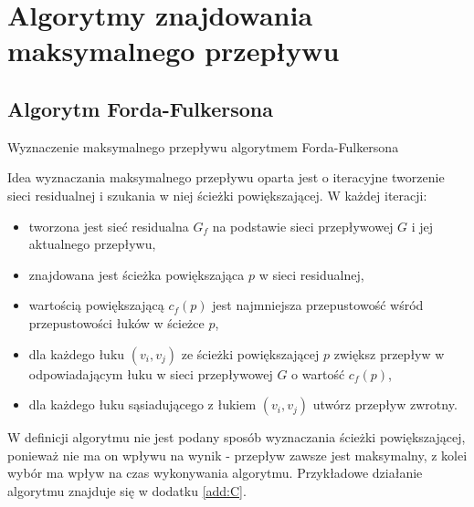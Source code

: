 \section{Algorytmy znajdowania maksymalnego przepływu}
\subsection{Algorytm Forda-Fulkersona}\label{ssec:FordFulkersonAnaliza}
\begin{algorithm}[H]
	\caption{Wyznaczenie maksymalnego przepływu algorytmem Forda-Fulkersona}\label{fordFulkersonPseudo}
	\begin{algorithmic}
				\EndFor
			\EndWhile\space
		\EndProcedure
	\end{algorithmic}
\end{algorithm}\noindent
Idea wyznaczania maksymalnego przepływu oparta jest o iteracyjne tworzenie sieci residualnej i szukania w niej ścieżki powiększającej. W każdej iteracji:
\begin{itemize}
	\item tworzona jest sieć residualna $ G_f $ na podstawie sieci przepływowej $ G $ i jej aktualnego przepływu,
	\item znajdowana jest ścieżka powiększająca $ p $ w sieci residualnej,
	\item wartością powiększającą $ c_f(p) $ jest najmniejsza przepustowość wśród przepustowości łuków w ścieżce $ p $,
	\item dla każdego łuku $ (v_i,v_j) $ ze ścieżki powiększającej $ p $ zwiększ przepływ w odpowiadającym łuku w sieci przepływowej $ G $ o wartość $ c_f(p) $,
	\item dla każdego łuku sąsiadującego z łukiem $ (v_i,v_j) $ utwórz przepływ zwrotny. 
\end{itemize}
W definicji algorytmu nie jest podany sposób wyznaczania ścieżki powiększającej, ponieważ nie ma on wpływu na wynik - przepływ zawsze jest maksymalny, z kolei wybór ma wpływ na czas wykonywania algorytmu. Przykładowe działanie algorytmu znajduje się w dodatku \ref{add:C}.
